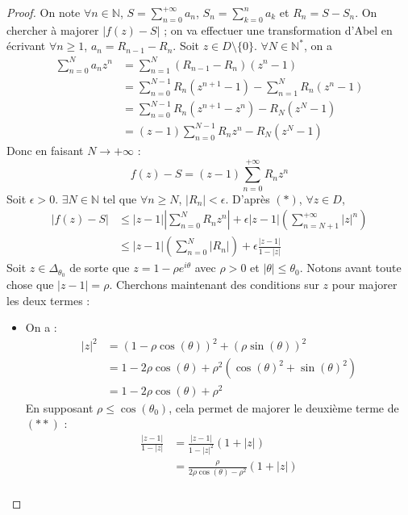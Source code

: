   \begin{proof}
    On note $\forall n \in \mathbb{N}$, $S = \sum_{n=0}^{+\infty} a_n$, $S_n = \sum_{k=0}^n a_k$ et $R_n = S - S_n$. On chercher à majorer $|f(z) - S|$ ; on va effectuer une transformation d'Abel en écrivant $\forall n \geq 1$, $a_n = R_{n-1} - R_n$. Soit $z \in D \setminus \{ 0 \}$. $\forall N \in \mathbb{N}^*$, on a
    \begin{align*}
      \sum_{n=0}^N a_n z^n &= \sum_{n=1}^N (R_{n-1} - R_n)(z^n - 1) \\
      &= \sum_{n=0}^{N-1} R_n(z^{n+1} - 1) - \sum_{n=1}^N R_n(z^n - 1) \\
      &= \sum_{n=0}^{N-1} R_n(z^{n+1} - z^n) - R_N(z^N - 1) \\
      &= (z-1) \sum_{n=0}^{N-1} R_nz^n - R_N(z^N - 1)
    \end{align*}
    Donc en faisant $N \rightarrow +\infty$ :
    \[ f(z) - S = (z-1) \sum_{n=0}^{+\infty} R_nz^n \tag{$*$} \]
    Soit $\epsilon > 0$. $\exists N \in \mathbb{N}$ tel que $\forall n \geq N$, $|R_n| < \epsilon$. D'après $(*)$, $\forall z \in D$,
    \begin{align*}
      |f(z)-S| &\leq |z-1| \left| \sum_{n=0}^N R_n z^n \right| + \epsilon |z-1| \left( \sum_{n=N+1}^{+\infty} |z|^n \right) \\
      &\leq |z-1| \left( \sum_{n=0}^N |R_n| \right) + \epsilon \frac{|z-1|}{1-|z|} \tag{$**$}
    \end{align*}
    Soit $z \in \Delta_{\theta_0}$ de sorte que $z = 1-\rho e^{i\theta}$ avec $\rho > 0$ et $|\theta| \leq \theta_0$. Notons avant toute chose que $|z-1| = \rho$. Cherchons maintenant des conditions sur $z$ pour majorer les deux termes :
    \begin{itemize}
      \item On a :
      \begin{align*}
        |z|^2 &= (1 - \rho \cos(\theta))^2 + (\rho \sin(\theta))^2 \\
        &= 1 - 2 \rho \cos(\theta) + \rho^2 (\cos(\theta)^2 + \sin(\theta)^2) \\
        &= 1 - 2 \rho \cos(\theta) + \rho^2
      \end{align*}
      En supposant $\rho \leq \cos(\theta_0)$, cela permet de majorer le deuxième terme de $(**)$ :
      \begin{align*}
        \frac{|z-1|}{1-|z|} &= \frac{|z-1|}{1-|z|^2}(1+|z|) \\
        &= \frac{\rho}{2 \rho \cos(\theta) - \rho^2}(1+|z|) \\

\end{align*}
\end{itemize}
\end{proof}
